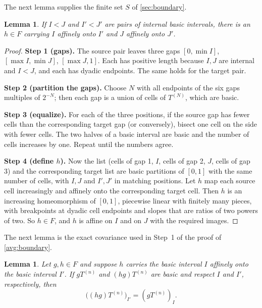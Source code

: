 \documentclass[11pt]{article}
\newtheorem{lemma}[theorem]{Lemma}
\theoremstyle{definition}
\numberwithin{equation}{section}
\newcommand{\step}[1]{\par\smallskip\noindent\textbf{Step #1.}\enspace}
\begin{document}
The next lemma supplies the finite set \(S\) of \cref{sec:boundary}.

\begin{lemma}\label{dyad:transport}
If \(I<J\) and \(I'<J'\) are pairs of internal basic intervals, there is
an \(h\in F\) carrying \(I\) affinely onto \(I'\) and \(J\) affinely onto
\(J'\).
\end{lemma}

\begin{proof}
\step{1 (gaps)}
The source pair leaves three gaps \([0,\min I]\), \([\max I,\min J]\),
\([\max J,1]\). Each has positive length because \(I,J\) are internal and
\(I<J\), and each has dyadic endpoints. The same holds for the target pair.

\step{2 (partition the gaps)}
Choose \(N\) with all endpoints of the six gaps multiples of \(2^{-N}\);
then each gap is a union of cells of \(T^{(N)}\), which are basic.

\step{3 (equalize)}
For each of the three positions, if the source gap has fewer cells than the
corresponding target gap (or conversely), bisect one cell on the side with
fewer cells. The two halves of a basic interval are basic and the number of
cells increases by one. Repeat until the numbers agree.

\step{4 (define \(h\))}
Now the list (cells of gap 1, \(I\), cells of gap 2, \(J\), cells of gap 3)
and the corresponding target list are basic partitions of \([0,1]\) with the
same number of cells, with \(I,J\) and \(I',J'\) in matching positions.
Let \(h\) map each source cell increasingly and affinely onto the
corresponding target cell. Then \(h\) is an increasing homeomorphism of
\([0,1]\), piecewise linear with finitely many pieces, with breakpoints at
dyadic cell endpoints and slopes that are ratios of two powers of two.
So \(h\in F\), and \(h\) is affine on \(I\) and on \(J\) with the required
images.
\end{proof}

The next lemma is the exact covariance used in Step~1 of the proof of
\cref{avg:boundary}.

\begin{lemma}\label{dyad:cov}
Let \(g,h\in F\) and suppose \(h\) carries the basic interval \(I\) affinely
onto the basic interval \(I'\). If \(gT^{(n)}\) and \((hg)T^{(n)}\) are
basic and respect \(I\) and \(I'\), respectively, then
\begin{equation}\label{dyad:covariance}
  \bigl((hg)T^{(n)}\bigr)_{I'}=(gT^{(n)})_I.
\end{equation}
\end{lemma}
\end{document}
